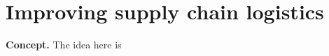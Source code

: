 \chapter{\sffamily Improving supply chain logistics}

{\bfseries\sffamily Concept.} The idea here is 

